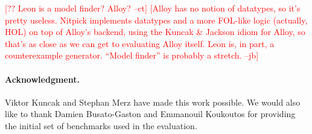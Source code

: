 \documentclass[runningheads,a4paper]{llncs}
\newcommand{\rem}[1]{\textcolor{red}{[#1]}}
\newcommand{\jb}[1]{\rem{#1 --jb}}
\newcommand{\ct}[1]{\rem{#1 --ct}}
\begin{document}
\ct{?? Leon is a model finder? Alloy?}
\jb{Alloy has no notion of datatypes, so it's pretty useless. Nitpick implements
datatypes and a more FOL-like logic (actually, HOL) on top of Alloy's backend,
using the Kuncak \& Jackson idiom for Alloy, so that's as close as we can get
to evaluating Alloy itself. Leon is, in part, a counterexample generator.
``Model finder'' is probably a stretch.}

{%
\def\ackname{Acknowledgment}
\paragraph{%
\ackname.}
Viktor Kuncak and Stephan Merz have made this work possible. We would also like
to thank Damien Busato-Gaston and Emmanouil Koukoutos for providing the initial
set of benchmarks used in the evaluation.
}



{


}
\end{document}
